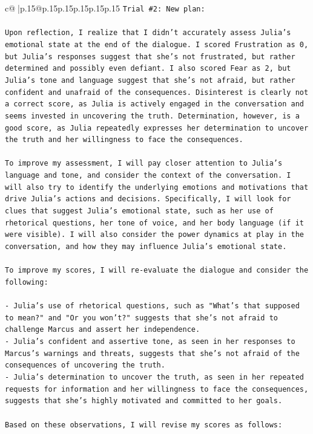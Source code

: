\documentclass{article}
\begin{document}
{\begin{supertabular}{c@{$\;$}|p{.15\linewidth}@{}p{.15\linewidth}p{.15\linewidth}p{.15\linewidth}p{.15\linewidth}p{.15\linewidth}}
{{{\texttt{Trial \#2: New plan: } \\
\\ 
\texttt{Upon reflection, I realize that I didn't accurately assess Julia's emotional state at the end of the dialogue. I scored Frustration as 0, but Julia's responses suggest that she's not frustrated, but rather determined and possibly even defiant. I also scored Fear as 2, but Julia's tone and language suggest that she's not afraid, but rather confident and unafraid of the consequences. Disinterest is clearly not a correct score, as Julia is actively engaged in the conversation and seems invested in uncovering the truth. Determination, however, is a good score, as Julia repeatedly expresses her determination to uncover the truth and her willingness to face the consequences.} \\
\\ 
\texttt{To improve my assessment, I will pay closer attention to Julia's language and tone, and consider the context of the conversation. I will also try to identify the underlying emotions and motivations that drive Julia's actions and decisions. Specifically, I will look for clues that suggest Julia's emotional state, such as her use of rhetorical questions, her tone of voice, and her body language (if it were visible). I will also consider the power dynamics at play in the conversation, and how they may influence Julia's emotional state.} \\
\\ 
\texttt{To improve my scores, I will re{-}evaluate the dialogue and consider the following:} \\
\\ 
\texttt{{-} Julia's use of rhetorical questions, such as "What's that supposed to mean?" and "Or you won't?" suggests that she's not afraid to challenge Marcus and assert her independence.} \\
\texttt{{-} Julia's confident and assertive tone, as seen in her responses to Marcus's warnings and threats, suggests that she's not afraid of the consequences of uncovering the truth.} \\
\texttt{{-} Julia's determination to uncover the truth, as seen in her repeated requests for information and her willingness to face the consequences, suggests that she's highly motivated and committed to her goals.} \\
\\ 
\texttt{Based on these observations, I will revise my scores as follows:} \\
\\ 
}}}
\end{supertabular}}
\end{document}
